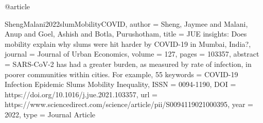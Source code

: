 {{{@article{ShengMalani2022slumMobilityCOVID,
   author = {Sheng, Jaymee and Malani, Anup and Goel, Ashish and Botla, Purushotham},
   title = {JUE insights: Does mobility explain why slums were hit harder by COVID-19 in Mumbai, India?},
   journal = {Journal of Urban Economics},
   volume = {127},
   pages = {103357},
   abstract = {SARS-CoV-2 has had a greater burden, as measured by rate of infection, in poorer communities within cities. For example, 55%
   keywords = {COVID-19
Infection
Epidemic
Slums
Mobility
Inequality},
   ISSN = {0094-1190},
   DOI = {https://doi.org/10.1016/j.jue.2021.103357},
   url = {https://www.sciencedirect.com/science/article/pii/S0094119021000395},
   year = {2022},
   type = {Journal Article}
}

}}}}
